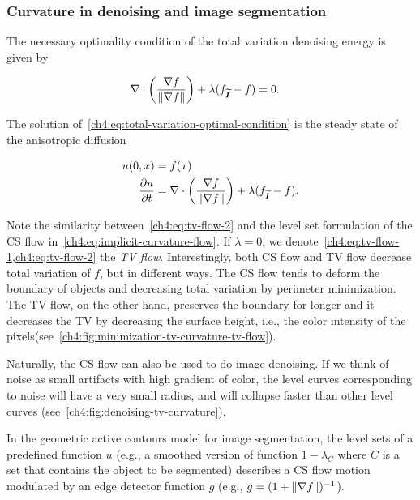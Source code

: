 \subsubsection{Curvature in denoising and image segmentation}

The necessary optimality condition of the total variation denoising energy is given by

\begin{align}
	\nabla \cdot \left( \frac{\nabla f}{\lVert\nabla f\rVert} \right) + \lambda( f_{\widetilde{\bm{I}}} - f ) &= 0.
	\label{ch4:eq:total-variation-optimal-condition}
\end{align}

The solution of~\cref{ch4:eq:total-variation-optimal-condition} is the steady state of the  anisotropic diffusion

\begin{align}
	u(0,x) &= f(x) 	\label{ch4:eq:tv-flow-1} \\
	\frac{\partial u}{\partial t} &= \nabla \cdot \left( \frac{\nabla f}{\lVert\nabla f\rVert} \right) + \lambda( f_{\widetilde{\bm{I}}} - f ). \label{ch4:eq:tv-flow-2}
\end{align}

Note the similarity between~\cref{ch4:eq:tv-flow-2} and the level set formulation of the CS flow in~\cref{ch4:eq:implicit-curvature-flow}. If $\lambda=0$, we denote~\cref{ch4:eq:tv-flow-1,ch4:eq:tv-flow-2} the \emph{TV flow}\cite{bellettini02total}. Interestingly, both CS flow and TV flow decrease total variation of $f$, but in different ways. The CS flow tends to deform the boundary of objects and decreasing total variation by perimeter minimization. The TV flow, on the other hand, preserves the boundary for longer and it decreases the TV by decreasing the surface height, i.e., the color intensity of the pixels(see~\cref{ch4:fig:minimization-tv-curvature-tv-flow}).

Naturally, the CS flow can also be used to do image denoising. If we think of noise as small artifacts with high gradient of color, the level curves corresponding to noise will have a very small radius, and will collapse faster than other level curves (see~\cref{ch4:fig:denoising-tv-curvature}). 


In the geometric active contours model for image segmentation, the level sets of a predefined function $u$ (e.g., a smoothed version of function $1-\lambda_C$ where $C$ is a set that contains the object to be segmented) describes a CS flow motion modulated by an edge detector function $g$ (e.g., $g=(1+\lVert \nabla f \rVert)^{-1}$).


